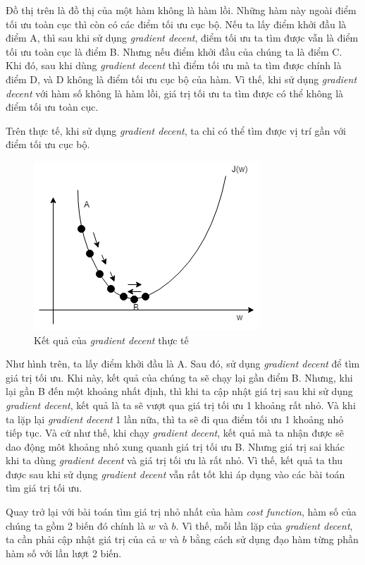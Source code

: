 Đồ thị trên là đồ thị của một hàm không là hàm lồi. Những hàm này ngoài điểm tối ưu toàn cục thì còn có các điểm tối ưu cục bộ. Nếu ta lấy điểm khởi đầu là điểm A, thì sau khi sử dụng \textit{gradient decent}, điểm tối ưu ta tìm được vẫn là điểm tối ưu toàn cục là điểm B. Nhưng nếu điểm khởi đầu của chúng ta là điểm C. Khi đó, sau khi dùng \textit{gradient decent} thì điểm tối ưu mà ta tìm được chính là điểm D, và D không là điểm tối ưu cục bộ của hàm. Vì thế, khi sử dụng \textit{gradient decent} với hàm số không là hàm lồi, giá trị tối ưu ta tìm được có thể không là điểm tối ưu toàn cục.

Trên thực tế, khi sử dụng \textit{gradient decent}, ta chỉ có thể tìm được vị trí gần với điểm tối ưu cục bộ.

\clearpage
\begin{figure}[!h]
\centerline{\includegraphics{chapter02/figure/grad_6.png}}
\caption{Kết quả của \textit{gradient decent} thực tế}
\label{fig:grad_6}
\end{figure}

Như hình trên, ta lấy điểm khởi đầu là A. Sau đó, sử dụng \textit{gradient decent} để tìm giá trị tối ưu. Khi này, kết quả của chúng ta sẽ chạy lại gần điểm B. Nhưng, khi lại gần B đến một khoảng nhất định, thì khi ta cập nhật giá trị sau khi sử dụng \textit{gradient decent}, kết quả là ta sẽ vượt qua giá trị tối ưu 1 khoảng rất nhỏ. Và khi ta lặp lại \textit{gradient decent} 1 lần nữa, thì ta sẽ đi qua điểm tối ưu 1 khoảng nhỏ tiếp tục. Và cứ như thế, khi chạy \textit{gradient decent}, kết quả mà ta nhận được sẽ dao động môt khoảng nhỏ xung quanh giá trị tối ưu B. Nhưng giá trị sai khác khi ta dùng \textit{gradient decent} và giá trị tối ưu là rất nhỏ. Vì thế, kết quả ta thu được sau khi sử dụng \textit{gradient decent} vẫn rất tốt khi áp dụng vào các bài toán tìm giá trị tối ưu.

Quay trở lại với bài toán tìm giá trị nhỏ nhất của hàm \textit{cost function}, hàm số của chúng ta gồm 2 biến đó chính là $w$ và $b$. Vì thế, mỗi lần lặp của \textit{gradient decent}, ta cần phải cập nhật giá trị của cả $w$ và $b$ bằng cách sử dụng đạo hàm từng phần hàm số với lần lượt 2 biến.

